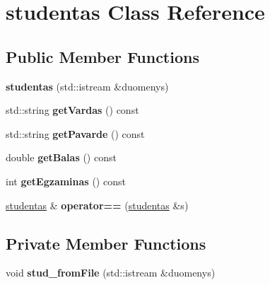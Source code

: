 \hypertarget{classstudentas}{}\section{studentas Class Reference}
\label{classstudentas}
\subsection*{Public Member Functions}
\begin{DoxyCompactItemize}
\item 
\mbox{\label{classstudentas_acb3167a335b73211915751ba1652e302}} 
{\bfseries studentas} (std\+::istream \&duomenys)
\item 
\mbox{\label{classstudentas_a7ebf70d9adaf2009f25967e37468cb25}} 
std\+::string {\bfseries get\+Vardas} () const
\item 
\mbox{\label{classstudentas_a0d290bc24c47b735bd5eac96f9c9e93e}} 
std\+::string {\bfseries get\+Pavarde} () const
\item 
\mbox{\label{classstudentas_a2ed748d9ee5c6b5bfd70bb2d50505289}} 
double {\bfseries get\+Balas} () const
\item 
\mbox{\label{classstudentas_a005a4c3ab079b040898b0ad12ddf23fe}} 
int {\bfseries get\+Egzaminas} () const
\item 
\mbox{\label{classstudentas_a3168deb4d64da5a618fc257f297d263b}} 
\mbox{\hyperlink{classstudentas}{studentas}} \& {\bfseries operator==} (\mbox{\hyperlink{classstudentas}{studentas}} \&s)
\end{DoxyCompactItemize}
\subsection*{Private Member Functions}
\begin{DoxyCompactItemize}
\item 
\mbox{\label{classstudentas_a1d8b300aec76a76f0c9a7ae22f6c169d}} 
void {\bfseries stud\+\_\+from\+File} (std\+::istream \&duomenys)
\end{DoxyCompactItemize}

